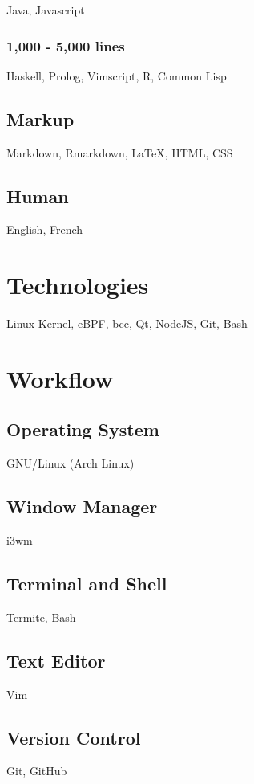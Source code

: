 \documentclass[]{article}
\theoremstyle{plain}
\theoremstyle{remark}
\theoremstyle{definition}
\begin{document}
\begin{figure}
\begin{minipage}[t]{0.32\textwidth}
Java, Javascript

\subsubsection{1,000 - 5,000 lines}

Haskell, Prolog, Vimscript, R, Common Lisp

\subsection{Markup}

Markdown, Rmarkdown, \LaTeX, HTML, CSS

\subsection{Human}

English, French

\section{Technologies}

Linux Kernel, eBPF, bcc, Qt, NodeJS, Git, Bash

\section{Workflow}

\subsection{Operating System}
GNU/Linux (Arch Linux)

\subsection{Window Manager}
i3wm

\subsection{Terminal and Shell}
Termite, Bash

\subsection{Text Editor}
Vim

\subsection{Version Control}
Git, GitHub


\end{minipage}
\end{figure}
\end{document}
